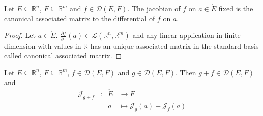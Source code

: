 \documentclass[11pt,en]{elegantpaper}
\newcommand{\Real}{\mathbb{R}}
\begin{document}
\begin{corollary}
  {\normalfont Let $E \subseteq \Real^n$, $F \subseteq \Real^m$ and $f \in \mathcal{D}(E,F)$.
  The jacobian of $f$ on $a \in \mathring{E}$ fixed is the canonical associated matrix to the differential of $f$ on $a$.} \par
   \par
\end{corollary}

\begin{proof}
  Let $a \in \mathring{E}$.
  $\frac{\partial f}{\partial \cdot}(a) \in \mathcal{L}(\Real^n,\Real^m)$ and any linear application in finite dimension
  with values in $\Real$ has an unique associated matrix in the standard basis called canonical associated matrix. \par
\end{proof}

\begin{proposition}\label{prop:jacobians_sum}
  {\normalfont
    Let $E \subseteq \Real^n$, $F \subseteq \Real^m$, $f \in \mathcal{D}(E,F)$ and $g \in \mathcal{D}(E,F)$.
    Then $g + f \in \mathcal{D}(E,F)$ and \begin{equation}
      \begin{array}{llll}
        \mathcal{J}_{g + f} & : & \mathring{E} & \longrightarrow F \\
        &   & a & \longmapsto \mathcal{J}_{g}(a) + \mathcal{J}_{f}(a)
      \end{array}
    \end{equation}
  }
\end{proposition}
\end{document}
